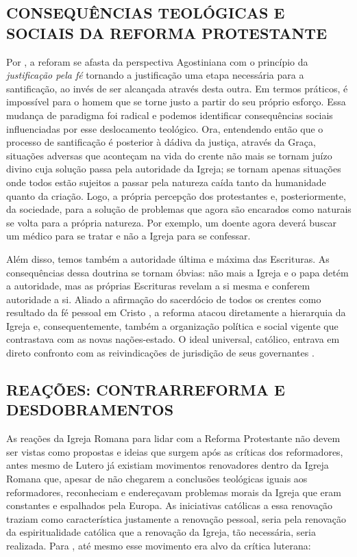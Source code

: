 \documentclass[
    article,            %
	12pt,				%
	oneside,			%
	a4paper,			%
	chapter=TITLE,		%
	section=TITLE,		%
	english,			%
	french,				%
	spanish,			%
	brazil				%
	]{abntex2}
\begin{document}
\subsection{CONSEQUÊNCIAS TEOLÓGICAS E SOCIAIS DA REFORMA PROTESTANTE}
Por , a reforam se afasta da perspectiva Agostiniana com o princípio da \emph{justificação pela fé} tornando a justificação uma etapa necessária para a santificação, ao invés de ser alcançada através desta outra. Em termos práticos, é impossível para o homem que se torne justo a partir do seu próprio esforço. Essa mudança de paradigma foi radical e podemos identificar consequências sociais influenciadas por esse deslocamento teológico. Ora, entendendo então que o processo de santificação é posterior à dádiva da justiça, através da Graça, situações adversas que aconteçam na vida do crente não mais se tornam juízo divino cuja solução passa pela autoridade da Igreja; se tornam apenas situações onde todos estão sujeitos a passar pela natureza caída tanto da humanidade quanto da criação. Logo, a própria percepção dos protestantes e, posteriormente, da sociedade, para a solução de problemas que agora são encarados como naturais se volta para a própria natureza. Por exemplo, um doente agora deverá buscar um médico para se tratar e não a Igreja para se confessar.

Além disso, temos também a autoridade última e máxima das Escrituras. As consequências dessa doutrina se tornam óbvias: não mais a Igreja e o papa detém a autoridade, mas as próprias Escrituras revelam a si mesma e conferem autoridade a si. Aliado a afirmação do sacerdócio de todos os crentes como resultado da fé pessoal em Cristo \cite[p.263]{CAIRNS}, a reforma atacou diretamente a hierarquia da Igreja e, consequentemente, também a organização política e social vigente que contrastava com as novas nações-estado. O ideal universal, católico, entrava em direto confronto com as reivindicações de jurisdição de seus governantes \cite[p.252]{CAIRNS}.

\subsection{REAÇÕES: CONTRARREFORMA E DESDOBRAMENTOS}
As reações da Igreja Romana para lidar com a Reforma Protestante não devem ser vistas como propostas e ideias que surgem após as críticas dos reformadores, antes mesmo de Lutero já existiam movimentos renovadores dentro da Igreja Romana que, apesar de não chegarem a conclusões teológicas iguais aos reformadores, reconheciam e endereçavam problemas morais da Igreja que eram constantes e espalhados pela Europa. As iniciativas católicas a essa renovação traziam como característica justamente a renovação pessoal, seria pela renovação da espiritualidade católica que a renovação da Igreja, tão necessária, seria realizada. Para , até mesmo esse movimento era alvo da crítica luterana:
\end{document}
